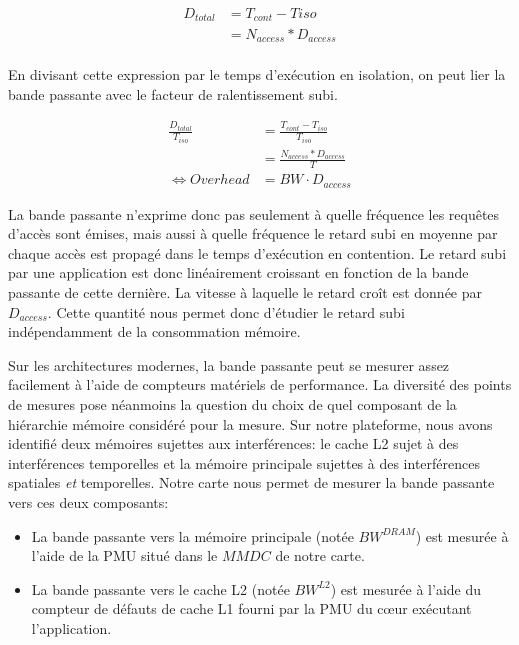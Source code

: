 \begin{equation}
	\begin{split}
		D_{total} &= T_{cont} - T{iso} \\
				  &= N_{access} * D_{access} \\
	\end{split}
\end{equation}

En divisant cette expression par le temps d'exécution en isolation, on peut lier la bande passante avec le facteur de ralentissement subi.

\begin{equation}
	\begin{split}
	 \frac{D_{total}}{T_{iso}} &= \frac{T_{cont} - T_{iso}}{T_{iso}} \\
	 						   &= \frac{N_{access} * D_{access}}{T} \\
	  \Leftrightarrow Overhead &= BW \cdot D_{access}
	\end{split}
	 \label{eq:o_bw_daccess}
\end{equation}

La bande passante n'exprime donc pas seulement à quelle fréquence les requêtes d'accès sont émises, mais aussi à quelle fréquence le retard subi en moyenne par chaque accès est propagé dans le temps d'exécution en contention.
Le retard subi par une application est donc linéairement croissant en fonction de la bande passante de cette dernière.
La vitesse à laquelle le retard croît est donnée par $D_{access}$.
Cette quantité nous permet donc d'étudier le retard subi indépendamment de la consommation mémoire.

Sur les architectures modernes, la bande passante peut se mesurer assez facilement à l'aide de compteurs matériels de performance.
La diversité des points de mesures pose néanmoins la question du choix de quel composant de la hiérarchie mémoire considéré pour la mesure.
Sur notre plateforme, nous avons identifié deux mémoires sujettes aux interférences: le cache L2 sujet à des interférences temporelles et la mémoire principale sujettes à des interférences spatiales \emph{et} temporelles.
Notre carte nous permet de mesurer la bande passante vers ces deux composants:
\begin{itemize}
	\item La bande passante vers la mémoire principale (notée $BW^{DRAM}$) est mesurée à l'aide de la PMU situé dans le $MMDC$ de notre carte.
	\item La bande passante vers le cache L2 (notée $BW^{L2}$) est mesurée à l'aide du compteur de défauts de cache L1 fourni par la PMU du cœur exécutant l'application.
\end{itemize}

